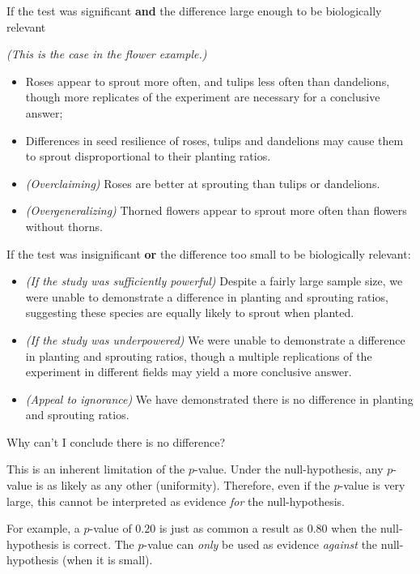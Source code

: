 \documentclass[
]{book}
\providecommand{\tightlist}{%
  \setlength{\itemsep}{0pt}\setlength{\parskip}{0pt}}
\begin{document}
If the test was significant \textbf{and} the difference large enough to be biologically relevant

\emph{(This is the case in the flower example.)}

\begin{itemize}
\tightlist
\item
  Roses appear to sprout more often, and tulips less often than dandelions, though more replicates of the experiment are necessary for a conclusive answer;
\item
  Differences in seed resilience of roses, tulips and dandelions may cause them to sprout disproportional to their planting ratios.
\item
  \emph{(Overclaiming)} Roses are better at sprouting than tulips or dandelions.
\item
  \emph{(Overgeneralizing)} Thorned flowers appear to sprout more often than flowers without thorns.
\end{itemize}

If the test was insignificant \textbf{or} the difference too small to be biologically relevant:

\begin{itemize}
\tightlist
\item
  \emph{(If the study was sufficiently powerful)} Despite a fairly large sample size, we were unable to demonstrate a difference in planting and sprouting ratios, suggesting these species are equally likely to sprout when planted.
\item
  \emph{(If the study was underpowered)} We were unable to demonstrate a difference in planting and sprouting ratios, though a multiple replications of the experiment in different fields may yield a more conclusive answer.
\item
  \emph{(Appeal to ignorance)} We have demonstrated there is no difference in planting and sprouting ratios.
\end{itemize}

Why can't I conclude there is no difference?

This is an inherent limitation of the \(p\)-value. Under the null-hypothesis, any \(p\)-value is as likely as any other (uniformity). Therefore, even if the \(p\)-value is very large, this cannot be interpreted as evidence \emph{for} the null-hypothesis.

For example, a \(p\)-value of \(0.20\) is just as common a result as \(0.80\) when the null-hypothesis is correct. The \(p\)-value can \emph{only} be used as evidence \emph{against} the null-hypothesis (when it is small).
\end{document}
